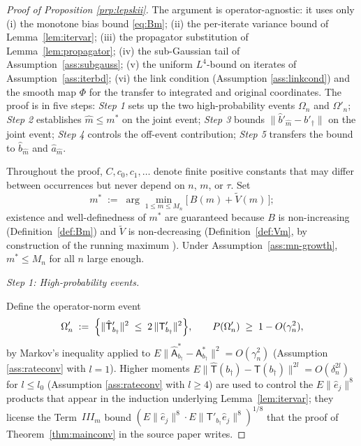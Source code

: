 \begin{proof}[Proof of Proposition \ref{prp:lepskii}]
The argument is operator-agnostic: it uses only
(i) the monotone bias bound \eqref{eq:Bm};
(ii) the per-iterate variance bound of Lemma~\ref{lem:itervar};
(iii) the propagator substitution of Lemma~\ref{lem:propagator};
(iv) the sub-Gaussian tail of Assumption~\ref{ass:subgauss};
(v) the uniform $L^4$-bound on iterates of Assumption~\ref{ass:iterbd};
(vi) the link condition (Assumption \ref{ass:linkcond}) and the smooth map
$\Phi$ for the transfer to integrated and original coordinates.
The proof is in five steps: \emph{Step 1} sets up the two high-probability
events $\Omega_n$ and $\Omega'_n$; \emph{Step 2} establishes $\hat m \le m^*$
on the joint event; \emph{Step 3} bounds $\|\hat b'_{\hat m} - b'_\dagger\|$
on the joint event; \emph{Step 4} controls the off-event contribution;
\emph{Step 5} transfers the bound to $\hat b_{\hat m}$ and $\hat a_{\hat m}$.

Throughout the proof, $C, c_0, c_1, \ldots$ denote finite positive constants
that may differ between occurrences but never depend on $n$, $m$, or $\tau$.
Set
\[
m^{*} \;:=\; \arg\min_{1 \le m \le M_n}\!\bigl[\,B(m) + \tilde V(m)\,\bigr];
\]
existence and well-definedness of $m^*$ are guaranteed because $B$ is
non-increasing (Definition~\ref{def:Bm}) and $\tilde V$ is non-decreasing
(Definition~\ref{def:Vm}, by construction of the running maximum
). Under Assumption~\ref{ass:mn-growth}, $m^* \le M_n$ for all $n$
large enough. %

\smallskip
\emph{Step 1: High-probability events.}

Define the operator-norm event %
\begin{equation}\label{eq:Omegaprime}
\Omega'_n \;:=\; \Bigl\{\|\hat{\mathsf T}'_{b_\dagger}\|^2
\;\le\; 2\,\|\mathsf T'_{b_\dagger}\|^2\Bigr\},
\qquad
P(\Omega'_n) \;\ge\; 1 - O(\gamma_n^2),
\end{equation}
by Markov's inequality applied to
$E\|\hat{\mathsf A}^{*}_{b_\dagger} - \mathsf A^{*}_{b_\dagger}\|^2 = O(\gamma_n^2)$
(Assumption \ref{ass:rateconv} with $l = 1$). Higher moments
$E\|\hat{\mathsf T}(b_\dagger) - \mathsf T(b_\dagger)\|^{2l} = O(\delta_n^{2l})$
for $l \le l_0$ (Assumption \ref{ass:rateconv} with $l \ge 4$) %
are used to control the $E\|\hat e_j\|^{8}$ products that appear in the
induction underlying Lemma~\ref{lem:itervar}; they license the
Term~$III_m$ bound
$(E\|\hat e_j\|^8 \cdot E\|\mathsf T'_{b_\dagger}\hat e_j\|^8)^{1/8}$
that the proof of Theorem~\ref{thm:mainconv} in the source paper writes.


\end{proof}
